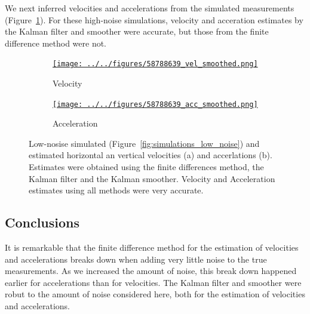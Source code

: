 \documentclass[12pt]{article}
\begin{document}
We next inferred velocities and accelerations from the simulated measurements
(Figure~\ref{fig:vel_acc_high_noise}).  For these high-noise simulations,
velocity and acceration estimates by the Kalman filter and smoother were
accurate, but those from the finite difference method were not.

\begin{figure}

    \begin{subfigure}{\textwidth}
        \centering
        \href{http://www.gatsby.ucl.ac.uk/~rapela/fwg/lds_repo/inference/figures/58788639_vel_smoothed.html}{\texttt{[image: ../../figures/58788639\_vel\_smoothed.png]}}
        \caption{Velocity}
    \end{subfigure}

    \begin{subfigure}{\textwidth}
        \centering
        \href{http://www.gatsby.ucl.ac.uk/~rapela/fwg/lds_repo/inference/figures/58788639_acc_smoothed.html}{\texttt{[image: ../../figures/58788639\_acc\_smoothed.png]}}
        \caption{Acceleration}
    \end{subfigure}

    \caption{Low-nosise simulated (Figure~\ref{fig:simulations_low_noise}) and
    estimated horizontal an vertical velocities (a) and accerlations (b).
    Estimates were obtained using the finite differences method, the Kalman
    filter and the Kalman smoother. Velocity and Acceleration estimates using
    all methods were very accurate.}

    \label{fig:vel_acc_high_noise}

\end{figure}

\subsection{Conclusions}

It is remarkable that the finite difference method for the estimation of
velocities and accelerations breaks down when adding very little noise to the
true measurements. As we increased the amount of noise, this break down
happened earlier for accelerations than for velocities.
%
The Kalman filter and smoother were robut to the amount of noise considered
here, both for the estimation of velocities and accelerations.



\end{document}
